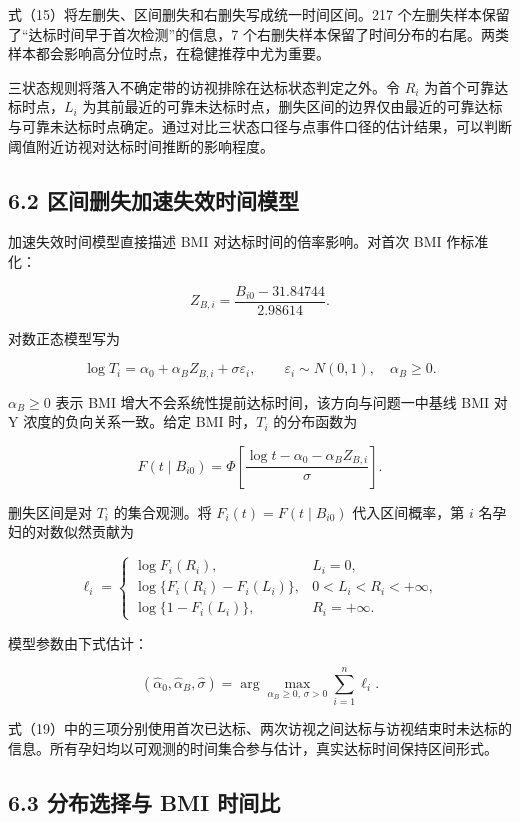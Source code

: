 \documentclass[UTF8,fontset=fandol,zihao=-4,a4paper]{ctexart}
\begin{document}
式（15）将左删失、区间删失和右删失写成统一时间区间。217
个左删失样本保留了``达标时间早于首次检测''的信息，7
个右删失样本保留了时间分布的右尾。两类样本都会影响高分位时点，在稳健推荐中尤为重要。

三状态规则将落入不确定带的访视排除在达标状态判定之外。令 \(R_i\)
为首个可靠达标时点，\(L_i\)
为其前最近的可靠未达标时点，删失区间的边界仅由最近的可靠达标与可靠未达标时点确定。通过对比三状态口径与点事件口径的估计结果，可以判断阈值附近访视对达标时间推断的影响程度。

\subsection{6.2
区间删失加速失效时间模型}\label{ux533aux95f4ux5220ux5931ux52a0ux901fux5931ux6548ux65f6ux95f4ux6a21ux578b}

加速失效时间模型直接描述 BMI 对达标时间的倍率影响。对首次 BMI 作标准化：

\[
Z_{B,i}=\frac{B_{i0}-31.84744}{2.98614}.
\tag{16}
\]

对数正态模型写为

\[
\log T_i=\alpha_0+\alpha_B Z_{B,i}+\sigma\varepsilon_i,
\qquad
\varepsilon_i\sim N(0,1),
\quad \alpha_B\ge0.
\tag{17}
\]

\(\alpha_B\ge0\) 表示 BMI
增大不会系统性提前达标时间，该方向与问题一中基线 BMI 对 Y
浓度的负向关系一致。给定 BMI 时，\(T_i\) 的分布函数为

\[
F(t\mid B_{i0})
=\Phi\left[
\frac{\log t-\alpha_0-\alpha_B Z_{B,i}}{\sigma}
\right].
\tag{18}
\]

删失区间是对 \(T_i\) 的集合观测。将 \(F_i(t)=F(t\mid B_{i0})\)
代入区间概率，第 \(i\) 名孕妇的对数似然贡献为

\[
\ell_i=
\begin{cases}
\log F_i(R_i), & L_i=0,\\[4pt]
\log\{F_i(R_i)-F_i(L_i)\}, & 0<L_i<R_i<+\infty,\\[4pt]
\log\{1-F_i(L_i)\}, & R_i=+\infty.
\end{cases}
\tag{19}
\]

模型参数由下式估计：

\[
(\widehat\alpha_0,\widehat\alpha_B,\widehat\sigma)
=\arg\max_{\alpha_B\ge0,\,\sigma>0}
\sum_{i=1}^{n}\ell_i.
\tag{20}
\]

式（19）中的三项分别使用首次已达标、两次访视之间达标与访视结束时未达标的信息。所有孕妇均以可观测的时间集合参与估计，真实达标时间保持区间形式。

\subsection{6.3 分布选择与 BMI
时间比}\label{ux5206ux5e03ux9009ux62e9ux4e0e-bmi-ux65f6ux95f4ux6bd4}
\end{document}
